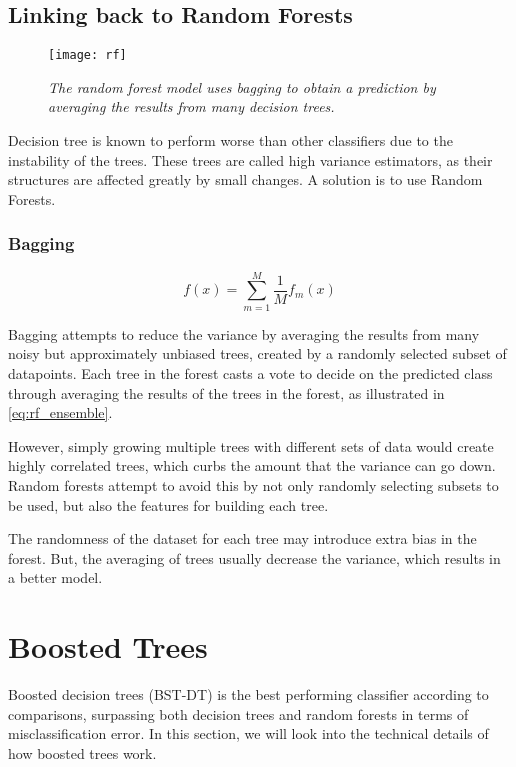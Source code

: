 \subsection{Linking back to Random Forests}

\begin{figure}[H]
  \centering
  \texttt{[image: rf]}
  \caption{\textit{The random forest model uses bagging to obtain a prediction by averaging the results from many decision trees.}}
  \label{fig:rf}
\end{figure}

Decision tree is known to perform worse than other classifiers due to the instability of the trees. These trees are called high variance estimators, as their structures are affected greatly by small changes. A solution is to use Random Forests. 

\subsubsection{Bagging}

\begin{equation} \label{eq:rf_ensemble}
  f(x) = \sum_{m=1}^M \frac{1}{M}f_m(x)
\end{equation}

Bagging attempts to reduce the variance by averaging the results from many noisy but approximately unbiased trees, created by a randomly selected subset of datapoints. Each tree in the forest casts a vote to decide on the predicted class through averaging the results of the trees in the forest, as illustrated in \autoref{eq:rf_ensemble}.

However, simply growing multiple trees with different sets of data would create highly correlated trees, which curbs the amount that the variance can go down. Random forests attempt to avoid this by not only randomly selecting subsets to be used, but also the features for building each tree. 

The randomness of the dataset for each tree may introduce extra bias in the forest. But, the averaging of trees usually decrease the variance, which results in a better model.


\newpage
\section{Boosted Trees} \label{sec:tech-boosted}
Boosted decision trees (BST-DT) is the best performing classifier according to  comparisons, surpassing both decision trees and random forests in terms of misclassification error. In this section, we will look into the technical details of how boosted trees work.

